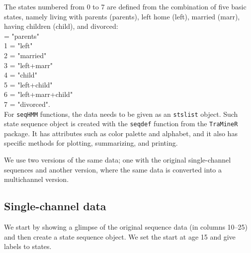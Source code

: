 \documentclass[12pt]{article}\usepackage[]{graphicx}\usepackage[]{color}
\begin{document}
The states numbered from 0 to 7 are defined from the combination of five basic states, namely living with parents (parents), left home (left), married (marr), having children (child), and divorced: \\

 = "parents" \\
1 = "left" \\
2 = "married" \\
3 = "left+marr" \\
4 = "child" \\
5 = "left+child" \\
6 = "left+marr+child" \\
7 = "divorced". \\

For \texttt{seqHMM} functions, the data needs to be given as an \texttt{stslist} object. Such state sequence object is created with the \texttt{seqdef} function from the \texttt{TraMineR} package. It has attributes such as color palette and alphabet, and it also has specific methods for plotting, summarizing, and printing.

We use two versions of the same data; one with the original single-channel sequences and another version, where the same data is converted into a multichannel version.

\subsection{Single-channel data}

We start by showing a glimpse of the original sequence data (in columns 10--25) and then create a state sequence object. We set the start at age 15 and give labels to states.
\end{document}
